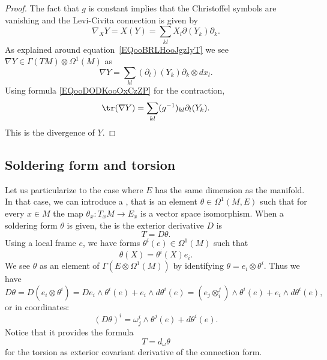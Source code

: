 \begin{proof}
	The fact that \( g\) is constant implies that the Christoffel symbols are vanishing and the Levi-Civita connection is given by
	\begin{equation}
		\nabla_XY=X(Y)=\sum_{kl}X_l\partial(Y_k)\partial_k.
	\end{equation}
	As explained around equation~\ref{EQooBRLHooJgzIyT} we see \( \nabla Y\in\Gamma(TM)\otimes \Omega^1(M)\) as
	\begin{equation}
		\nabla Y=\sum_{kl}(\partial_l)(Y_k)\partial_k\otimes dx_l.
	\end{equation}
	Using formula \eqref{EQooDODKooOxCzZP} for the contraction,
	\begin{equation}
		\tr(\nabla Y)=\sum_{kl}(g^{-1})_{kl}\partial_l(Y_k).
	\end{equation}
	This is the divergence of \( Y\).
\end{proof}

\subsection{Soldering form and torsion}

Let us particularize to the case where $E$ has the same dimension as the manifold. In that case, we can introduce a , that is an element $\theta\in \Omega^1(M,E)$ such that for every $x\in M$ the map $\theta_x\colon T_xM\to E_x$ is a vector space isomorphism.
When a soldering form $\theta$ is given, the  is the exterior derivative $D$ is
\begin{equation}
	T=D\theta.
\end{equation}
Using a local frame $e$, we have forms $\theta^i(e)\in\Omega^1(M)$ such that
\[
	\theta(X)=\theta^i(X)e_i.
\]
We see $\theta$ as an element of $\Gamma(E\otimes \Omega^1(M))$ by identifying $\theta=e_i\otimes\theta^i$. Thus we have
\[
	D\theta=D(e_i\otimes\theta^i)	=De_i\wedge\theta^i(e)+e_i\wedge d\theta^i(e)
	=(e_j\otimes^j_i)\wedge\theta^i(e)+e_i\wedge d\theta^i(e),
\]
or in coordinates:
\begin{equation}
	(D\theta)^i=\omega_j^i\wedge \theta^j(e)+d\theta^i(e).
\end{equation}
Notice that it provides the formula
\begin{equation}
	T=d_{\omega}\theta
\end{equation}
for the torsion as exterior covariant derivative of the connection form.


